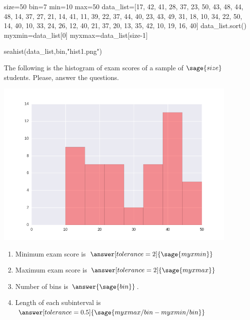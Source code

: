 \documentclass{ximera}
\begin{document}
\begin{problem}
\begin{sagesilent}
size=50
bin=7
min=10
max=50
data_list=[17, 42, 41, 28, 37, 23, 50, 43, 48, 44, 48, 14, 37, 27, 21, 14, 41, 11, 39, 22, 37, 44, 40, 23, 43, 49, 31, 18, 10, 34, 22, 50, 14, 40, 10, 33, 24, 26, 12, 40, 21, 37, 20, 13, 35, 42, 10, 19, 16, 40]
data_list.sort()
myxmin=data_list[0]
myxmax=data_list[size-1]


seahist(data_list,bin,"hist1.png")

\end{sagesilent}

The following is the histogram of exam scores of a sample of $\sage{size}$ students. Please, answer the questions.


\includegraphics[width=12cm]{hist1.png}

\begin{enumerate}
    \item Minimum exam score is $\answer[tolerance=2]{\sage{myxmin}}$
    \item Maximum exam score is $\answer[tolerance=2]{\sage{myxmax}}$
    \item Number of bins is $\answer{\sage{bin}}$.
    \item Length of each subinterval is $\answer[tolerance=0.5]{\sage{myxmax/bin-myxmin/bin}}$
\end{enumerate}
\end{problem}
\end{document}
